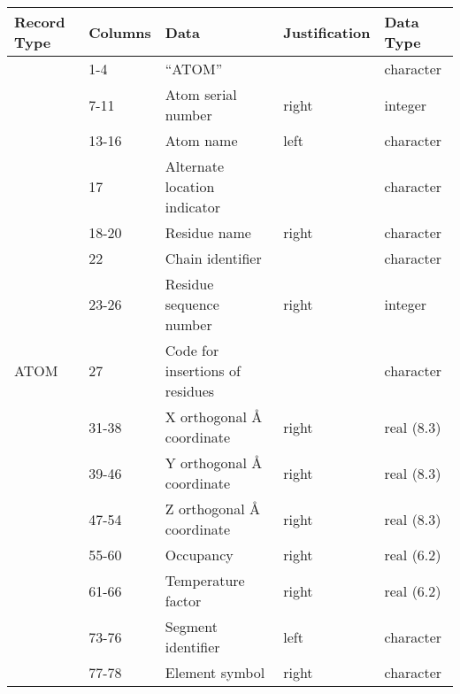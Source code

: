 \begin{table}[!ht]
\begin{tabular}{|l|l|l|l|l|}
\hline
Record Type             & Columns & Data                            & Justification & Data Type  \\ \hline
\multirow{15}{*}{ATOM}  & 1-4   & “ATOM”                          &               & character  \\ \cline{2-5} 
                        & 7-11  & Atom serial number              & right         & integer    \\ \cline{2-5} 
                        & 13-16   & Atom name                       & left         & character  \\ \cline{2-5} 
                        & 17      & Alternate location indicator    &               & character  \\ \cline{2-5} 
                        & 18-20  & Residue name                    & right         & character  \\ \cline{2-5} 
                        & 22      & Chain identifier                &               & character  \\ \cline{2-5} 
                        & 23-26   & Residue sequence number         & right         & integer    \\ \cline{2-5} 
                        & 27      & Code for insertions of residues &               & character  \\ \cline{2-5} 
                        & 31-38   & X orthogonal Å coordinate       & right         & real (8.3) \\ \cline{2-5} 
                        & 39-46   & Y orthogonal Å coordinate       & right         & real (8.3) \\ \cline{2-5} 
                        & 47-54   & Z orthogonal Å coordinate       & right         & real (8.3) \\ \cline{2-5} 
                        & 55-60   & Occupancy                       & right         & real (6.2) \\ \cline{2-5} 
                        & 61-66   & Temperature factor              & right         & real (6.2) \\ \cline{2-5} 
                        & 73-76   & Segment identifier              & left          & character  \\ \cline{2-5} 
                        & 77-78   & Element symbol                  & right         & character  \\ \hline

\end{tabular}
\end{table}
